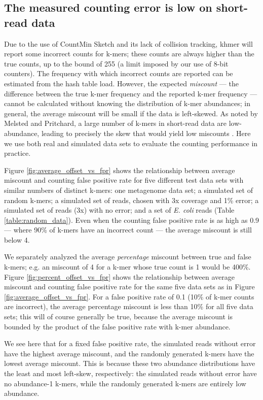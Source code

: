 \documentclass[10pt]{article}
\begin{document}
\subsection*{The measured counting error is low on short-read data}

Due to the use of CountMin Sketch and its lack of collision tracking,
khmer will report some incorrect counts for k-mers; these counts are
always higher than the true counts, up to the bound of 255 (a limit
imposed by our use of 8-bit counters). The frequency with which
incorrect counts are reported can be estimated from the hash table
load.  However, the expected {\em miscount} --- the difference between
the true k-mer frequency and the reported k-mer frequency --- cannot
be calculated without knowing the distribution of k-mer abundances; in
general, the average miscount will be small if the data is
left-skewed.  As noted by Melsted and Pritchard, a large number of
k-mers in short-read data are low-abundance, leading to precisely the
skew that would yield low miscounts \cite{Melsted2011}.  Here we use
both real and simulated data sets to evaluate the counting performance
in practice.

Figure \ref{fig:average_offset_vs_fpr} shows the relationship between
average miscount and counting false positive rate for five different test data
sets with similar numbers of distinct k-mers: one metagenome data set;
a simulated set of random k-mers; a simulated set of reads, chosen
with 3x coverage and 1\% error; a simulated set of reads (3x) with no
error; and a set of {\em E. coli} reads (Table
\ref{table:random_data}).  Even when the counting false positive rate is as
high as 0.9 --- where 90\% of k-mers have an incorrect count --- the
average miscount is still below 4.

We separately analyzed the average {\em percentage} miscount between
true and false k-mers; e.g. an miscount of 4 for a k-mer whose true
count is 1 would be 400\%.  Figure \ref{fig:percent_offset_vs_fpr}
shows the relationship between average miscount and counting false
positive rate for the same five data sets as in Figure
\ref{fig:average_offset_vs_fpr}.  For a false positive rate of 0.1 (10\% of
k-mer counts are incorrect), the average percentage miscount is less
than 10\% for all five data sets; this will of course generally be
true, because the average miscount is bounded by the product of the
false positive rate with k-mer abundance.

We see here that for a fixed false positive rate, the simulated reads
without error have the highest average miscount, and the randomly
generated k-mers have the lowest average miscount.  This is because
these two abundance distributions have the least and most left-skew,
respectively: the simulated reads without error have no abundance-1
k-mers, while the randomly generated k-mers are entirely low
abundance.
\end{document}
